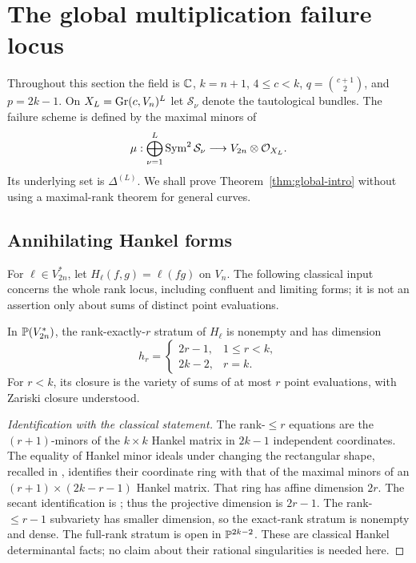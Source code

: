 \section{The global multiplication failure locus}\label{sec:global-geometry}
Throughout this section the field is $\mathbb C$, $k=n+1$, $4\le c<k$, $q=\binom{c+1}{2}$, and $p=2k-1$. On $X_L=\operatorname{Gr}(c,V_n)^L$ let $\mathcal S_\nu$ denote the tautological bundles. The failure scheme is defined by the maximal minors of
\[
 \mu:\bigoplus_{\nu=1}^L\operatorname{Sym}^2\mathcal S_\nu
                       \longrightarrow V_{2n}\otimes\mathcal O_{X_L}.
\]
Its underlying set is $\Delta^{(L)}$. We shall prove Theorem~\ref{thm:global-intro} without using a maximal-rank theorem for general curves.

\subsection{Annihilating Hankel forms}
For $\ell\in V_{2n}^*$, let $H_\ell(f,g)=\ell(fg)$ on $V_n$. The following classical input concerns the whole rank locus, including confluent and limiting forms; it is not an assertion only about sums of distinct point evaluations.
\begin{lemma}\label{lem:hankel-strata}
In $\mathbb P(V_{2n}^*)$, the rank-exactly-$r$ stratum of $H_\ell$ is nonempty and has dimension
\[
 h_r=\begin{cases}2r-1,&1\le r<k,\\2k-2,&r=k.\end{cases}
\]
For $r<k$, its closure is the variety of sums of at most $r$ point evaluations, with Zariski closure understood.
\end{lemma}
\begin{proof}[Identification with the classical statement]
The rank-$\le r$ equations are the $(r+1)$-minors of the $k\times k$ Hankel matrix in $2k-1$ independent coordinates. The equality of Hankel minor ideals under changing the rectangular shape, recalled in \cite[Section 1]{CMSV}, identifies their coordinate ring with that of the maximal minors of an $(r+1)\times(2k-r-1)$ Hankel matrix. That ring has affine dimension $2r$. The secant identification is \cite[Section 2, equation (2.0.1)]{CMSV}; thus the projective dimension is $2r-1$. The rank-$\le r-1$ subvariety has smaller dimension, so the exact-rank stratum is nonempty and dense. The full-rank stratum is open in $\mathbb P^{2k-2}$. These are classical Hankel determinantal facts; no claim about their rational singularities is needed here.
\end{proof}


